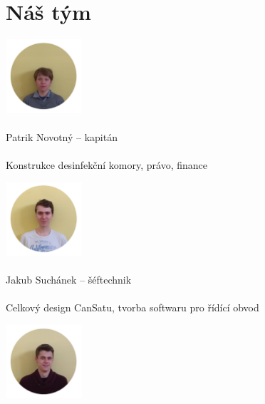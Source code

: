 \documentclass[a4paper]{report}
\newenvironment{MulticolFigure}
  {\par\medskip\noindent\minipage{\linewidth}}
  {\endminipage\par\medskip}
\begin{document}
\section{Náš tým}
\begin{multicols}{2}
\begin{center}
\begin{MulticolFigure}
\centering
\includegraphics[width=80pt]{patrik.png}
\end{MulticolFigure}
\paragraph{} \large Patrik Novotný – kapitán
\paragraph{} \normalsize Konstrukce desinfekční komory, právo, finance
\begin{MulticolFigure}
\centering
\includegraphics[width=80pt]{suchy.png}
\end{MulticolFigure}
\paragraph{} \large Jakub Suchánek – šéftechnik
\paragraph{} \normalsize Celkový design CanSatu, tvorba softwaru pro řídící obvod
\begin{MulticolFigure}
\centering
\includegraphics[width=80pt]{lukas.png}
\end{MulticolFigure}

\end{center}
\end{multicols}
\end{document}
